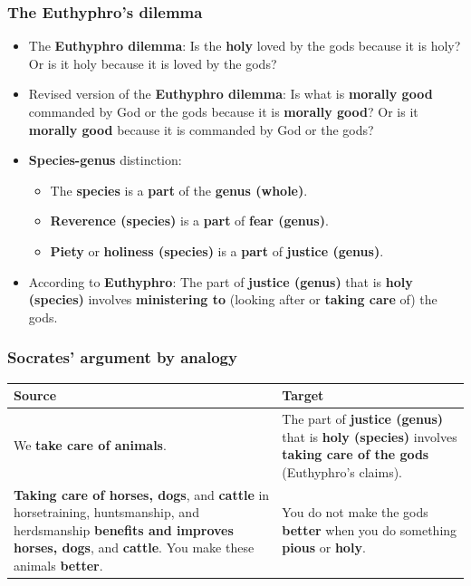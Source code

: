 \documentclass[11pt]{article}
\begin{document}
\subsubsection{The Euthyphro's dilemma}
\label{sec:org1e4f748}
\begin{itemize}
\item The \textbf{Euthyphro dilemma}:
Is the \textbf{holy} loved by the gods because it is holy? Or is it holy because it is loved by the gods?
\item Revised version of the \textbf{Euthyphro dilemma}:
Is what is \textbf{morally good} commanded by God or the gods because it is \textbf{morally good}? Or is it \textbf{morally good} because it is commanded by God or the gods?
\item \textbf{Species-genus} distinction:
\begin{itemize}
\item The \textbf{species} is a \textbf{part} of the \textbf{genus (whole)}.
\item \textbf{Reverence (species)} is a \textbf{part} of \textbf{fear (genus)}.
\item \textbf{Piety} or \textbf{holiness (species)} is a \textbf{part} of \textbf{justice (genus)}.
\end{itemize}
\item According to \textbf{Euthyphro}:
The part of \textbf{justice (genus)} that is \textbf{holy (species)} involves \textbf{ministering to} (looking after or \textbf{taking care} of) the gods.
\end{itemize}
\subsubsection{Socrates' argument by analogy}
\label{sec:orgfbbeaa7}
\begin{center}
\begin{tabularx}{\textwidth}{|X|X|}
\hline
Source & Target\\
\hline
We \textbf{take care of animals}. & The part of \textbf{justice (genus)} that is \textbf{holy (species)} involves \textbf{taking care of the gods} (Euthyphro's claims).\\
\hline
\textbf{Taking care of horses, dogs}, and \textbf{cattle} in horsetraining, huntsmanship, and herdsmanship \textbf{benefits and improves horses, dogs}, and \textbf{cattle}. You make these animals \textbf{better}. & You do not make the gods \textbf{better} when you do something \textbf{pious} or \textbf{holy}.\\
\hline
\end{tabularx}
\end{center}
\end{document}
